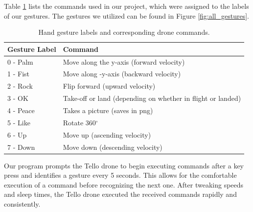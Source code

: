 Table \ref{tab:gesture_commands} lists the commands used in our project, which were assigned to the labels of our gestures. The gestures we utilized can be found in Figure \ref{fig:all_gestures}.

\begin{table}[ht]
	\centering
		\caption{ Hand gesture labels and corresponding drone commands. }
	\begin{tabular}{ll}
		\toprule
		Gesture Label & Command \\
		\midrule
		0 - Palm& Move along the y-axis (forward velocity) \\
		1 - Fist& Move along -y-axis (backward velocity) \\
		2 - Rock& Flip forward (upward velocity) \\
		3 - OK & Take-off or land (depending on whether in flight or landed) \\
		4 - Peace& Takes a picture (saves in png) \\
		5 - Like& Rotate 360$^\circ$ \\
		6 - Up& Move up (ascending velocity) \\
		7 - Down & Move down (descending velocity)\\
		\bottomrule
	\end{tabular}

	\label{tab:gesture_commands}
\end{table}

Our program prompts the Tello drone to begin executing commands after a key press and identifies a gesture every 5 seconds. This allows for the comfortable execution of a command before recognizing the next one. After tweaking speeds and sleep times, the Tello drone executed the received commands rapidly and consistently.

